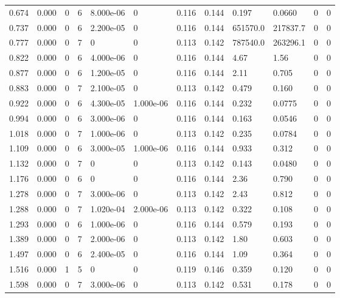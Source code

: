 \documentclass[preview]{standalone}
\begin{document}
{{\begin{tabular}{L{1.2cm}C{1.2cm} C{0.3cm}C{0.5cm} C{1.4cm}C{1.4cm} C{1.4cm}C{1.4cm} C{1.6cm}C{1.6cm} C{1.6cm}C{1.6cm}}
  0.674  &  0.000  & 0     &  6 &  8.000e-06  & 0  &  0.116&   0.144& 0.197 & 0.0660   &  0 & 0  \\ 
  0.737  &  0.000  & 0     &  6 &  2.200e-05  & 0  &  0.116&   0.144& 651570.0 & 217837.7   &  0 & 0  \\ 
  0.777  &  0.000  & 0     &  7 &  0  & 0  &  0.113&   0.142& 787540.0 & 263296.1   &  0 & 0  \\ 
  0.822  &  0.000  & 0     &  6 &  4.000e-06  & 0  &  0.116&   0.144& 4.67 & 1.56   &  0 & 0  \\ 
  0.877  &  0.000  & 0     &  6 &  1.200e-05  & 0  &  0.116&   0.144& 2.11 & 0.705   &  0 & 0  \\ 
  0.883  &  0.000  & 0     &  7 &  2.100e-05  & 0  &  0.113&   0.142& 0.479 & 0.160   &  0 & 0  \\ 
  0.922  &  0.000  & 0     &  6 &  4.300e-05  & 1.000e-06  &  0.116&   0.144& 0.232 & 0.0775   &  0 & 0  \\ 
  0.994  &  0.000  & 0     &  6 &  3.000e-06  & 0  &  0.116&   0.144& 0.163 & 0.0546   &  0 & 0  \\ 
  1.018  &  0.000  & 0     &  7 &  1.000e-06  & 0  &  0.113&   0.142& 0.235 & 0.0784   &  0 & 0  \\ 
  1.109  &  0.000  & 0     &  6 &  3.000e-05  & 1.000e-06  &  0.116&   0.144& 0.933 & 0.312   &  0 & 0  \\ 
  1.132  &  0.000  & 0     &  7 &  0  & 0  &  0.113&   0.142& 0.143 & 0.0480   &  0 & 0  \\ 
  1.176  &  0.000  & 0     &  6 &  0  & 0  &  0.116&   0.144& 2.36 & 0.790   &  0 & 0  \\ 
  1.278  &  0.000  & 0     &  7 &  3.000e-06  & 0  &  0.113&   0.142& 2.43 & 0.812   &  0 & 0  \\ 
  1.288  &  0.000  & 0     &  7 &  1.020e-04  & 2.000e-06  &  0.113&   0.142& 0.322 & 0.108   &  0 & 0  \\ 
  1.293  &  0.000  & 0     &  6 &  1.000e-06  & 0  &  0.116&   0.144& 0.579 & 0.193   &  0 & 0  \\ 
  1.389  &  0.000  & 0     &  7 &  2.000e-06  & 0  &  0.113&   0.142& 1.80 & 0.603   &  0 & 0  \\ 
  1.497  &  0.000  & 0     &  6 &  2.400e-05  & 0  &  0.116&   0.144& 1.09 & 0.364   &  0 & 0  \\ 
  1.516  &  0.000  & 1     &  5 &  0  & 0  &  0.119&   0.146& 0.359 & 0.120   &  0 & 0  \\ 
  1.598  &  0.000  & 0     &  7 &  3.000e-06  & 0  &  0.113&   0.142& 0.531 & 0.178   &  0 & 0  \\ 

\end{tabular}}}
\end{document}

